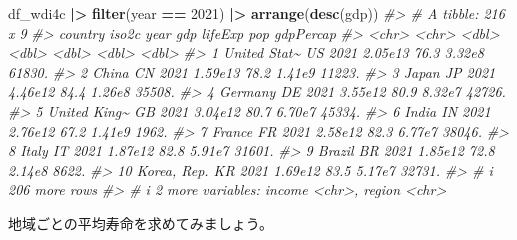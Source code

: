 \documentclass[
  xelatex, ja=standard]{bxjsbook}
\newenvironment{Shaded}{\begin{snugshade}}{\end{snugshade}}
\newcommand{\CommentTok}[1]{\textcolor[rgb]{0.56,0.35,0.01}{\textit{#1}}}
\newcommand{\DecValTok}[1]{\textcolor[rgb]{0.00,0.00,0.81}{#1}}
\newcommand{\FunctionTok}[1]{\textcolor[rgb]{0.13,0.29,0.53}{\textbf{#1}}}
\newcommand{\NormalTok}[1]{#1}
\newcommand{\SpecialCharTok}[1]{\textcolor[rgb]{0.81,0.36,0.00}{\textbf{#1}}}
\theoremstyle{definition}
\theoremstyle{definition}
\theoremstyle{definition}
\theoremstyle{definition}
\theoremstyle{remark}
\begin{document}
\begin{Shaded}
\begin{Highlighting}[]
\NormalTok{df\_wdi4c }\SpecialCharTok{|\textgreater{}} \FunctionTok{filter}\NormalTok{(year }\SpecialCharTok{==} \DecValTok{2021}\NormalTok{) }\SpecialCharTok{|\textgreater{}} \FunctionTok{arrange}\NormalTok{(}\FunctionTok{desc}\NormalTok{(gdp))}
\CommentTok{\#\textgreater{} \# A tibble: 216 x 9}
\CommentTok{\#\textgreater{}    country      iso2c  year     gdp lifeExp    pop gdpPercap}
\CommentTok{\#\textgreater{}    \textless{}chr\textgreater{}        \textless{}chr\textgreater{} \textless{}dbl\textgreater{}   \textless{}dbl\textgreater{}   \textless{}dbl\textgreater{}  \textless{}dbl\textgreater{}     \textless{}dbl\textgreater{}}
\CommentTok{\#\textgreater{}  1 United Stat\textasciitilde{} US     2021 2.05e13    76.3 3.32e8    61830.}
\CommentTok{\#\textgreater{}  2 China        CN     2021 1.59e13    78.2 1.41e9    11223.}
\CommentTok{\#\textgreater{}  3 Japan        JP     2021 4.46e12    84.4 1.26e8    35508.}
\CommentTok{\#\textgreater{}  4 Germany      DE     2021 3.55e12    80.9 8.32e7    42726.}
\CommentTok{\#\textgreater{}  5 United King\textasciitilde{} GB     2021 3.04e12    80.7 6.70e7    45334.}
\CommentTok{\#\textgreater{}  6 India        IN     2021 2.76e12    67.2 1.41e9     1962.}
\CommentTok{\#\textgreater{}  7 France       FR     2021 2.58e12    82.3 6.77e7    38046.}
\CommentTok{\#\textgreater{}  8 Italy        IT     2021 1.87e12    82.8 5.91e7    31601.}
\CommentTok{\#\textgreater{}  9 Brazil       BR     2021 1.85e12    72.8 2.14e8     8622.}
\CommentTok{\#\textgreater{} 10 Korea, Rep.  KR     2021 1.69e12    83.5 5.17e7    32731.}
\CommentTok{\#\textgreater{} \# i 206 more rows}
\CommentTok{\#\textgreater{} \# i 2 more variables: income \textless{}chr\textgreater{}, region \textless{}chr\textgreater{}}
\end{Highlighting}
\end{Shaded}

地域ごとの平均寿命を求めてみましょう。
\end{document}
